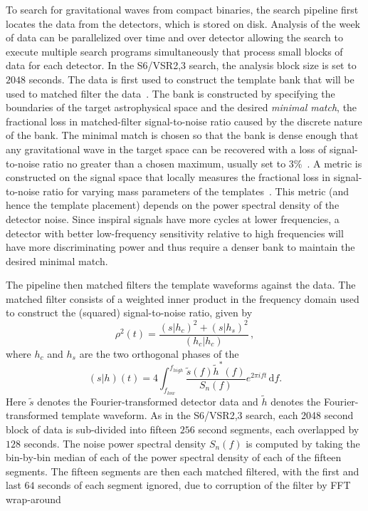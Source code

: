 To search for gravitational waves from compact binaries, the search pipeline
first locates the data from the detectors, which is stored on disk. Analysis
of the week of data can be parallelized over time and over detector allowing
the search to execute multiple search programs simultaneously that process
small blocks of data for each detector. In the S6/VSR2,3 search, the 
analysis block size is set to $2048$ seconds.
The data is first used to construct the
template bank that will be used to matched filter the
data~\cite{Sathyaprakash:1991mt,Dhurandhar:1992mw,Owen:1995tm,Owen:1998dk,Babak:2006ty}.
The bank is constructed by specifying the boundaries of the target
astrophysical space and the desired \emph{minimal match}, the fractional loss in
matched-filter signal-to-noise ratio caused by the discrete nature of the bank.
The minimal match is chosen so that the bank is dense enough that any
gravitational wave in the target space can be recovered with a loss of
signal-to-noise ratio no greater than a chosen maximum, usually set to 3\%~\cite{Abbott:2011ys}. 
A metric is constructed on the signal space that
locally measures the fractional loss in signal-to-noise ratio for varying mass
parameters of the templates~\cite{Owen:1998dk}.  This metric (and hence
the template placement) depends on the power spectral density of the
detector noise. Since inspiral signals have more cycles at lower frequencies,
a detector with better low-frequency sensitivity relative to high frequencies
will have more discriminating power and thus require a denser bank to maintain
the desired minimal match.

The pipeline then matched filters the template waveforms against the data.
The matched filter consists of a weighted inner product in the frequency
domain used to construct the (squared) signal-to-noise ratio, given by
%
\begin{equation}
\rho^2(t) = \frac{(s|h_c)^2 + (s|h_s)^2}{(h_c|h_c)} \, ,
\label{eq:snr}
\end{equation}
%
where $h_c$ and $h_s$ are the two orthogonal phases of the 
%
\begin{equation}
(s|h)(t) = 4\int_{f_{low}}^{f_{high}} \frac{\tilde{s}(f)\tilde{h}^*(f)}{S_n (f)}e^{2\pi i f t}\, \mathrm{d}f.
\label{eq:ip}
\end{equation}
%
Here $\tilde{s}$ denotes the Fourier-transformed detector data and $\tilde{h}$
denotes the Fourier-transformed template waveform. As in the S6/VSR2,3 search,
each 2048 second block of data is sub-divided into fifteen $256$ second
segments, each overlapped by $128$ seconds. The noise power spectral
density $S_n(f)$ is computed by taking the bin-by-bin median of each of the power
spectral density of each of the fifteen segments. The fifteen segments are then each
matched filtered, with the first and last $64$ seconds of each segment
ignored, due to corruption of the filter by FFT
wrap-around~\cite{Allen:2005fk}

